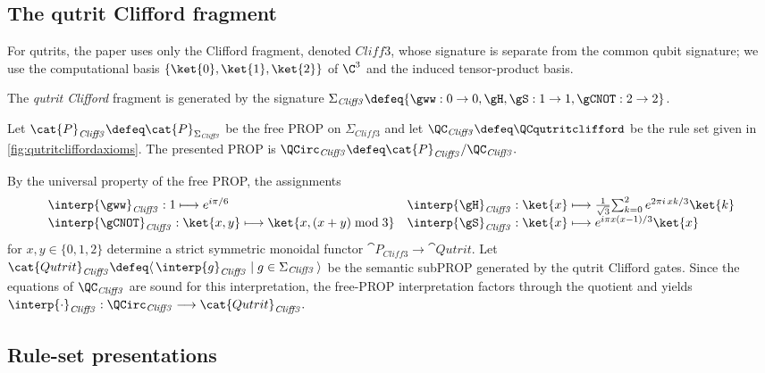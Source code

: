 \subsection{The qutrit Clifford fragment}
\label{subsec:qutrit-clifford-fragment}

For qutrits, the paper uses only the Clifford fragment, denoted \(\mathit{Cliff3}\), whose
signature is separate from the common qubit signature; we use the computational basis
\(\{\ket{0},\ket{1},\ket{2}\}\) of \(\C^3\) and the induced tensor-product basis.

\begin{definition}\label{def:qutrit-clifford-fragment}
The \emph{qutrit Clifford} fragment is generated by the signature
\(\Sigma_{\mathit{Cliff3}}\defeq
\{\gww:0\to0,\gH,\gS:1\to1,\gCNOT:2\to2\}\).

Let \(\cat{P}_{\mathit{Cliff3}}\defeq\cat{P}_{\Sigma_{\mathit{Cliff3}}}\) be the free PROP on
\(\Sigma_{\mathit{Cliff3}}\) and let \(\QC_{\mathit{Cliff3}}\defeq\QCqutritclifford\) be the rule
set given in \cref{fig:qutritcliffordaxioms}.  The presented PROP is
\(
  \QCirc_{\mathit{Cliff3}}\defeq\cat{P}_{\mathit{Cliff3}}/\QC_{\mathit{Cliff3}}.
\)
\end{definition}

By the universal property of the free PROP, the assignments
\begin{equation*}
\begin{array}{l l}
 \interp{\gww}_{\mathit{Cliff3}} : 1\longmapsto e^{i\pi/6} & 
 \interp{\gH}_{\mathit{Cliff3}} : \ket{x}\longmapsto 
   \tfrac1{\sqrt3}\!\sum_{k=0}^2 e^{2\pi i\,xk/3}\ket{k} \\
 \interp{\gCNOT}_{\mathit{Cliff3}} : \ket{x,y}\longmapsto \ket{x,(x+y)\bmod 3} &
 \interp{\gS}_{\mathit{Cliff3}} : \ket{x}\longmapsto
   e^{i\pi x(x-1)/3}\ket{x} 
\end{array}
\end{equation*}
for \(x,y\in\{0,1,2\}\) determine a strict symmetric monoidal functor
\(\cat{P}_{\mathit{Cliff3}}\to\cat{Qutrit}\).  Let
\(\cat{Qutrit}_{\mathit{Cliff3}}\defeq\langle\,\interp{g}_{\mathit{Cliff3}}\mid g\in\Sigma_{\mathit{Cliff3}}\,\rangle\)
be the semantic subPROP generated by the qutrit Clifford gates.  Since the equations of
\(\QC_{\mathit{Cliff3}}\) are sound for this interpretation, the free-PROP interpretation factors
through the quotient and yields
\(
  \interp{\cdot}_{\mathit{Cliff3}}:\QCirc_{\mathit{Cliff3}}\longrightarrow\cat{Qutrit}_{\mathit{Cliff3}}.
\)

\subsection{Rule-set presentations}


